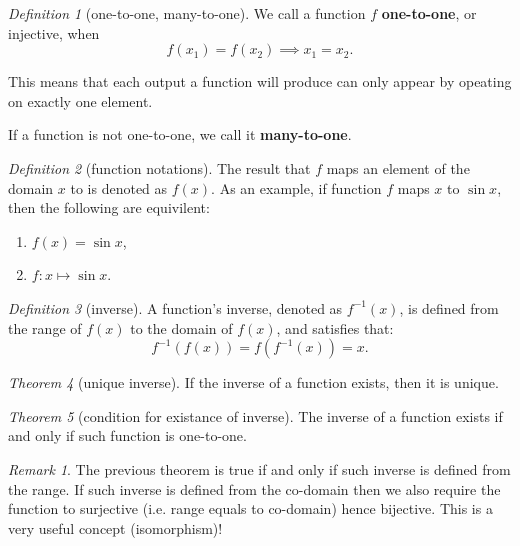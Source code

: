 \documentclass[8pt]{article}
\theoremstyle{remark}
\newtheorem{theorem}{Theorem}[section]
\newtheorem{definition}[theorem]{Definition}
\newtheorem*{remark}{Remark}
\begin{document}
        \begin{definition}[one-to-one, many-to-one]
            We call a function $f$ \textbf{one-to-one}, or injective, when
            $$
                f(x_1) = f(x_2) \implies x_1 = x_2.
            $$
            
            This means that each output a function will produce can only appear by opeating on exactly one element.

            If a function is not one-to-one, we call it \textbf{many-to-one}.
        \end{definition}

        \begin{definition}[function notations]
            The result that $f$ maps an element of the domain $x$ to is denoted as $f(x)$. As an example, if function $f$ maps $x$ to $\sin x$, then the following are equivilent:
            \begin{enumerate}
                \item $f(x) = \sin x$,
                \item $f: x \mapsto \sin x$.
            \end{enumerate}
        \end{definition}

        \begin{definition}[inverse]
            A function's inverse, denoted as $f^{-1}(x)$, is defined from the range of $f(x)$ to the domain of $f(x)$, and satisfies that:
            $$
                f^{-1}(f(x)) = f(f^{-1}(x))= x.
            $$
        \end{definition}

        \begin{theorem}[unique inverse]
            If the inverse of a function exists, then it is unique.
        \end{theorem}

        \begin{theorem}[condition for existance of inverse]
            The inverse of a function exists if and only if such function is one-to-one.
        \end{theorem}

        \begin{remark}
            The previous theorem is true if and only if such inverse is defined from the range. If such inverse is defined from the co-domain then we also require the function to surjective (i.e. range equals to co-domain) hence bijective. This is a very useful concept (isomorphism)!
        \end{remark}
\end{document}
